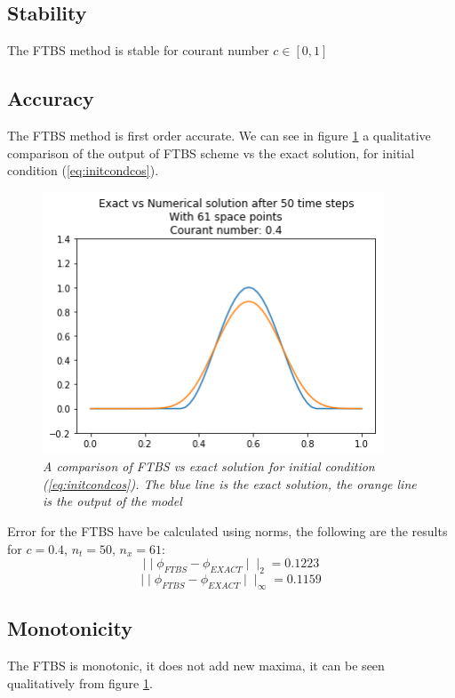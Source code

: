 \subsection{Stability} \label{stabilityftbs}
The FTBS method is stable for courant number $c\in[0,1]$

\subsection{Accuracy}
The FTBS method is first order accurate. We can see in figure \ref{fig:ftbsvsexact} a qualitative comparison of the output of FTBS scheme vs the exact solution, for initial condition (\ref{eq:initcondcos}).
\begin{figure}[H]
	\begin{center}
		\includegraphics[width=4in]{graphics/FTBS_vs_exact.png}
	\end{center}%
	\caption[A comparison of FTBS vs exact solution.]{ \em A comparison of FTBS vs exact solution for initial condition (\ref{eq:initcondcos}). The blue line is the exact solution, the orange line is the output of the model}
	\label{fig:ftbsvsexact}
\end{figure}
Error for the FTBS have be calculated using norms, the following are the results for $c=0.4$, $n_t=50$, $n_x=61$:
\begin{equation}
\mid\mid \phi_{FTBS} - \phi_{EXACT}\mid\mid_2=0.1223
\label{eq:norm2ftbs}
\end{equation}
\begin{equation}
\mid\mid \phi_{FTBS} - \phi_{EXACT}\mid\mid_{\infty}=0.1159
\label{eq:norminfftbs}
\end{equation}

\subsection{Monotonicity}
The FTBS is monotonic, it does not add new maxima, it can be seen qualitatively from figure \ref{fig:ftbsvsexact}.

